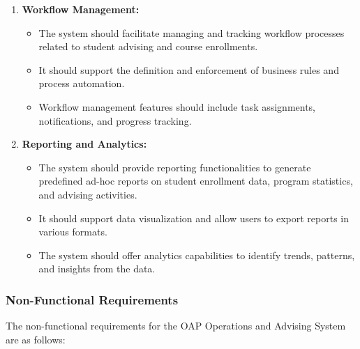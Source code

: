 \documentclass[12pt]{article}
\begin{document}
\begin{enumerate}[label=(\roman*)]
\begin{itemize}
    \end{itemize}
    \item \textbf{Workflow Management:}
    \begin{itemize}
        \item The system should facilitate managing and tracking workflow processes related to student advising and course enrollments.
        \item It should support the definition and enforcement of business rules and process automation.
        \item Workflow management features should include task assignments, notifications, and progress tracking.
    \end{itemize}
    \item \textbf{Reporting and Analytics:}
    \begin{itemize}
        \item The system should provide reporting functionalities to generate predefined ad-hoc reports on student enrollment data, program statistics, and advising activities.
        \item It should support data visualization and allow users to export reports in various formats.
        \item The system should offer analytics capabilities to identify trends, patterns, and insights from the data.
    \end{itemize}
\end{enumerate}

\subsubsection{Non-Functional Requirements}
The non-functional requirements for the OAP Operations and Advising System are as follows:
\end{document}
